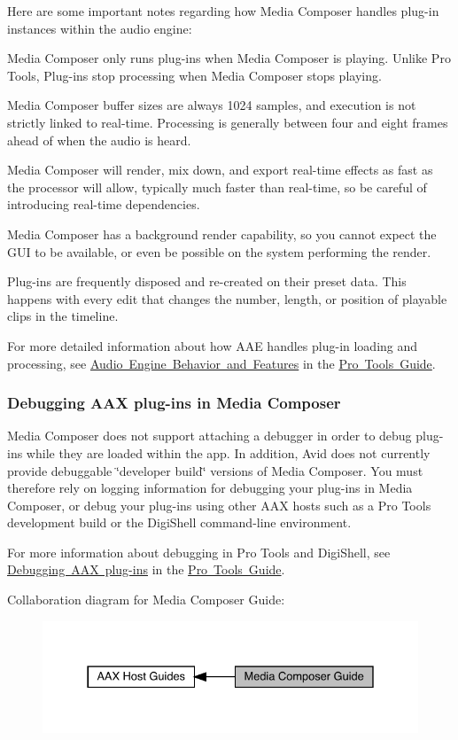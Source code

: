 Here are some important notes regarding how Media Composer handles plug-\/in instances within the audio engine\+: 
\begin{DoxyItemize}
\item Media Composer only runs plug-\/ins when Media Composer is playing. Unlike Pro Tools, Plug-\/ins stop processing when Media Composer stops playing.  
\item Media Composer buffer sizes are always 1024 samples, and execution is not strictly linked to real-\/time. Processing is generally between four and eight frames ahead of when the audio is heard.  
\item Media Composer will render, mix down, and export real-\/time effects as fast as the processor will allow, typically much faster than real-\/time, so be careful of introducing real-\/time dependencies.  
\item Media Composer has a background render capability, so you cannot expect the G\+UI to be available, or even be possible on the system performing the render.  
\item Plug-\/ins are frequently disposed and re-\/created on their preset data. This happens with every edit that changes the number, length, or position of playable clips in the timeline.  
\end{DoxyItemize}

For more detailed information about how A\+AE handles plug-\/in loading and processing, see \mbox{\hyperlink{a00830_aax_pro_tools_guide_03_audio_engine_behavior}{Audio Engine Behavior and Features}} in the \mbox{\hyperlink{a00830}{Pro Tools Guide}}.

\hypertarget{a00831_subsection__aax_media_composer_guide__debugging}{}\subsubsection{Debugging A\+A\+X plug-\/ins in Media Composer}\label{a00831_subsection__aax_media_composer_guide__debugging}
 Media Composer does not support attaching a debugger in order to debug plug-\/ins while they are loaded within the app. In addition, Avid does not currently provide debuggable \char`\"{}developer build\char`\"{} versions of Media Composer. You must therefore rely on logging information for debugging your plug-\/ins in Media Composer, or debug your plug-\/ins using other A\+AX hosts such as a Pro Tools development build or the Digi\+Shell command-\/line environment.

For more information about debugging in Pro Tools and Digi\+Shell, see \mbox{\hyperlink{a00830_aax_pro_tools_guide_06_debugging_aax_plugins}{Debugging A\+AX plug-\/ins}} in the \mbox{\hyperlink{a00830}{Pro Tools Guide}}.

 Collaboration diagram for Media Composer Guide\+:
\nopagebreak
\begin{figure}[H]
\begin{center}
\leavevmode
\includegraphics[width=331pt]{a00831}
\end{center}
\end{figure}
